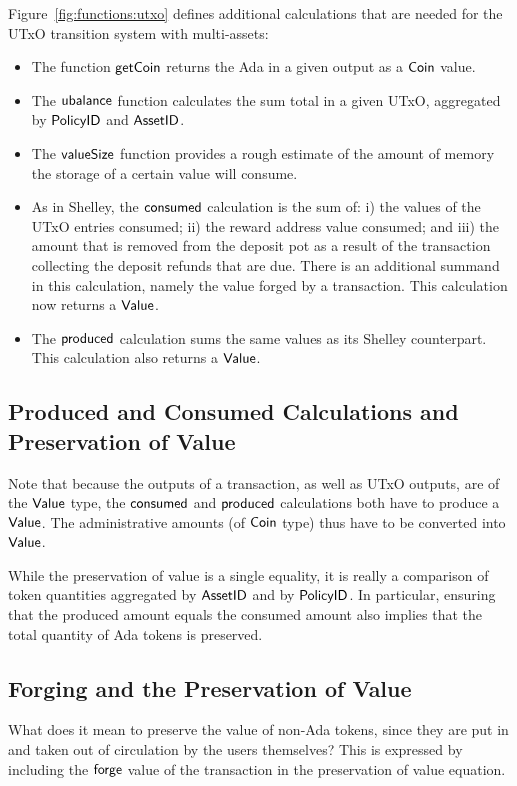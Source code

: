 Figure~\ref{fig:functions:utxo} defines additional calculations that are needed for the
UTxO transition system with multi-assets:

\begin{itemize}

  \item The function $\mathsf{getCoin}$ returns the Ada in a given output as a $\mathsf{Coin}$ value.

  \item
    The $\mathsf{ubalance}$ function calculates the sum total in a given UTxO,
    aggregated by $\mathsf{PolicyID}$ and $\mathsf{AssetID}$.

  \item The $\mathsf{valueSize}$ function provides a rough estimate of
    the amount of memory the storage of a certain value will consume.

  \item As in Shelley, the $\mathsf{consumed}$ calculation is the sum of: i) the values of the
   UTxO entries consumed; ii) the reward address value consumed;
   and iii) the amount that is removed from the deposit pot as a result of
   the transaction collecting the deposit refunds that are due. There is an additional
   summand in this calculation, namely the value forged by a transaction.
   This calculation now returns a $\mathsf{Value}$.

  \item The $\mathsf{produced}$ calculation sums the same values
  as its Shelley counterpart.
  This calculation also returns a $\mathsf{Value}$.
\end{itemize}

\subsection*{Produced and Consumed Calculations and Preservation of Value}
Note that because the outputs of a transaction, as well as UTxO
outputs, are of the $\mathsf{Value}$ type, the $\mathsf{consumed}$ and
$\mathsf{produced}$ calculations both have to produce a $\mathsf{Value}$. The
administrative amounts (of $\mathsf{Coin}$ type) thus have to be converted
into $\mathsf{Value}$.

While the preservation of value is a single
equality, it is really a comparison of token quantities aggregated by
$\mathsf{AssetID}$ and by $\mathsf{PolicyID}$. In particular, ensuring that the produced
amount equals the consumed amount also implies that the total quantity of
Ada tokens is preserved.

\subsection*{Forging and the Preservation of Value}
What does it mean to preserve the value of non-Ada tokens, since they
are put in and taken out of circulation by the users themselves?
This is expressed by including the $\mathsf{forge}$ value of the transaction
in the preservation of value equation.

